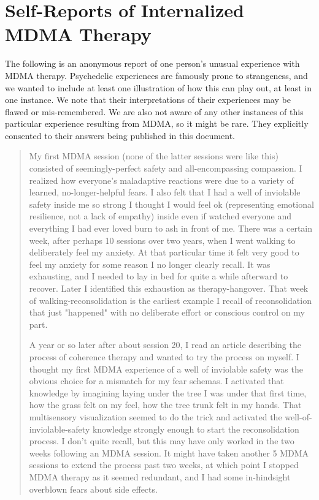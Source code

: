\documentclass[12pt,letterpaper]{book}
\begin{document}
\chapter{Self-Reports of Internalized MDMA Therapy}
\label{autobiography}
The following is an anonymous report of one person's unusual experience with MDMA therapy. Psychedelic experiences are famously prone to strangeness, and we wanted to include at least one illustration of how this can play out, at least in one instance. We note that their interpretations of their experiences may be flawed or mis-remembered. We are also not aware of any other instances of this particular experience resulting from MDMA, so it might be rare. They explicitly consented to their answers being published in this document.
\begin{quotation}
    My first MDMA session (none of the latter sessions were like this) consisted of seemingly-perfect safety and all-encompassing compassion. I realized how everyone's maladaptive reactions were due to a variety of learned, no-longer-helpful fears. I also felt that I had a well of inviolable safety inside me so strong I thought I would feel ok (representing emotional resilience, not a lack of empathy) inside even if watched everyone and everything I had ever loved burn to ash in front of me. There was a certain week, after perhaps 10 sessions over two years, when I went walking to deliberately feel my anxiety. At that particular time it felt very good to feel my anxiety for some reason I no longer clearly recall. It was exhausting, and I needed to lay in bed for quite a while afterward to recover. Later I identified this exhaustion as therapy-hangover. That week of walking-reconsolidation is the earliest example I recall of reconsolidation that just "happened" with no deliberate effort or conscious control on my part.
    
    A year or so later after about session 20, I read an article describing the process of coherence therapy and wanted to try the process on myself. I thought my first MDMA experience of a well of inviolable safety was the obvious choice for a mismatch for my fear schemas. I activated that knowledge by imagining laying under the tree I was under that first time, how the grass felt on my feel, how the tree trunk felt in my hands. That multisensory visualization seemed to do the trick and activated the well-of-inviolable-safety knowledge strongly enough to start the reconsolidation process. I don't quite recall, but this may have only worked in the two weeks following an MDMA session. It might have taken another 5 MDMA sessions to extend the process past two weeks, at which point I stopped MDMA therapy as it seemed redundant, and I had some in-hindsight overblown fears about side effects.


\end{quotation}
\end{document}
